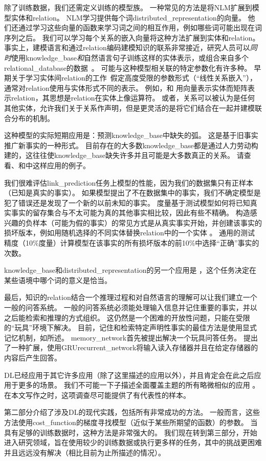 除了训练数据，我们还需定义训练的模型族。
一种常见的方法是将\gls{NLM}扩展到模型实体和\gls{relation}。
\gls{NLM}学习提供每个词\gls{distributed_representation}的向量。
他们还通过学习这些向量的函数来学习词之间的相互作用，例如哪些词可能出现在词序列之后。
我们可以学习每个关系的嵌入向量将这种方法扩展到实体和\gls{relation}。
事实上，建模语言和通过\gls{relation}编码建模知识的联系非常接近，研究人员可以\emph{同时}使用\gls{knowledge_base}\emph{和}自然语言句子训练这样的实体表示\citep{bordes-aaai-2011,Bordes-et-al-AISTATS2012-small,Wang-et-al-EMNLP2014}，或组合来自多个\gls{relational_database}的数据~\citep{Bordes-et-al-NIPS2013}。
可能与这种模型相关联的特定参数化有许多种。
早期关于学习实体间\gls{relation}的工作~\citep{Paccanaro2000}假定高度受限的参数形式（``线性关系嵌入''），通常对\gls{relation}使用与实体形式不同的表示。
例如，\citet{Paccanaro2000}和\citet{bordes-aaai-2011} 用向量表示实体而矩阵表示\gls{relation}，其思想是\gls{relation}在实体上像运算符。
或者，关系可以被认为是任何其他实体\citep{Bordes-et-al-AISTATS2012-small}，允许我们关于关系作声明，但是更灵活的是将它们结合在一起并建模联合分布的机制。

这种模型的实际短期应用是：预测\gls{knowledge_base}中缺失的弧。
这是基于旧事实推广新事实的一种形式。
目前存在的大多数\gls{knowledge_base}都是通过人力劳动构建的，这往往使\gls{knowledge_base}缺失许多并且可能是大多数真正的关系。
请查看\citet{Wang-et-al-AAAI2014}、\citet{Lin-et-al-AAAI2015}和\citet{Garcia-Duran-et-al-arxiv2015}中这样应用的例子。

我们很难评估\gls{link_prediction}任务上模型的性能，因为我们的数据集只有正样本（已知是真实的事实）。
如果模型提出了不在数据集中的事实，我们不确定模型是犯了错误还是发现了一个新的以前未知的事实。
度量基于测试模型如何将已知真实事实的留存集合与不太可能为真的其他事实相比较，因此有些不精确。
构造感兴趣的负样本（可能为假的事实）的常见方式是从真实事实开始，并创建该事实的损坏版本，例如用随机选择的不同实体替换\gls{relation}中的一个实体 。
通用的测试精度（10$\%$度量）计算模型在该事实的所有损坏版本的前10$\%$中选择``正确''事实的次数。

\gls{knowledge_base}和\gls{distributed_representation}的另一个应用是 \citep{Navigli+Verlardi-2005,Bordes-et-al-AISTATS2012-small}，这个任务决定在某些语境中哪个词的意义是恰当。

最后，知识的\gls{relation}结合一个推理过程和对自然语言的理解可以让我们建立一个一般的问答系统。
一般的问答系统必须能处理输入信息并记住重要的事实，并以之后能检索和推理的方式组织。
这仍然是一个困难的开放性问题，只能在受限的``玩具''环境下解决。
目前，记住和检索特定声明性事实的最佳方法是使用显式记忆机制，如所述。
\gls{memory_network}首先被提出解决一个玩具问答任务\citep{Weston2014}。
\citet{Kumar-et-al-arxiv2015} 提出了一种扩展，使用GRU\gls{recurrent_network}将输入读入存储器并且在给定存储器的内容后产生回答。

\gls{DL}已经应用于其它许多应用（除了这里描述的应用以外），并且肯定会在此之后应用于更多的场景。
我们不可能一下子描述全面覆盖主题的所有略微相似的应用 。
在本文写作之时，这项调查尽可能提供了有代表性的样本。

第二部分介绍了涉及\gls{DL}的现代实践，包括所有非常成功的方法。
一般而言，这些方法使用\gls{cost_function}的梯度寻找模型（近似于某些所期望的函数）的参数。
当具有足够的训练数据时，这种方法是非常强大的。
我们现在转到第三部分，开始进入研究领域，旨在使用较少的训练数据或执行更多样的任务，其中的挑战更困难并且远远没有解决（相比目前为止所描述的情况）。
